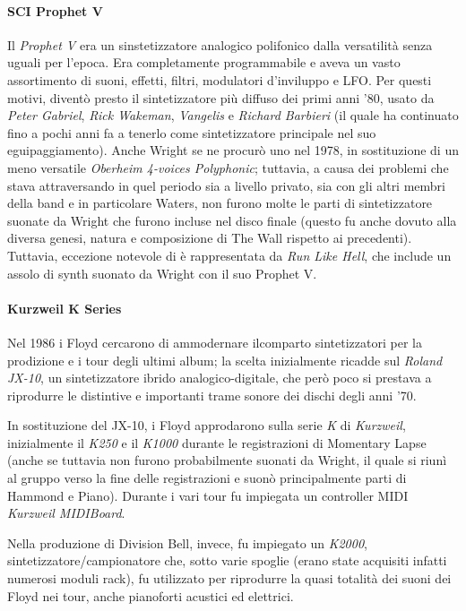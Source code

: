 \documentclass[class=book, crop=false, oneside, 12pt]{standalone}
\begin{document}
    \paragraph{SCI Prophet V}
    Il \emph{Prophet V} era un sinstetizzatore analogico polifonico dalla versatilità senza uguali per l'epoca. Era completamente programmabile e aveva un vasto assortimento di suoni, effetti, filtri, modulatori d'inviluppo e LFO. Per questi motivi, diventò presto il sintetizzatore più diffuso dei primi anni '80, usato da \emph{Peter Gabriel}, \emph{Rick Wakeman}, \emph{Vangelis} e \emph{Richard Barbieri} (il quale ha continuato fino a pochi anni fa a tenerlo come sintetizzatore principale nel suo eguipaggiamento). Anche Wright se ne procurò uno nel 1978, in sostituzione di un meno versatile \emph{Oberheim 4-voices Polyphonic}; tuttavia, a causa dei problemi che stava attraversando in quel periodo sia a livello privato, sia con gli altri membri della band e in particolare Waters, non furono molte le parti di sintetizzatore suonate da Wright che furono incluse nel disco finale (questo fu anche dovuto alla diversa genesi, natura e composizione di The Wall rispetto ai precedenti). Tuttavia, eccezione notevole di è rappresentata da \emph{Run Like Hell}, che include un assolo di synth suonato da Wright con il suo Prophet V.

    \paragraph{Kurzweil K Series}
    Nel 1986 i Floyd cercarono di ammodernare ilcomparto sintetizzatori per la prodizione e i  tour degli ultimi album; la scelta inizialmente ricadde sul \emph{Roland JX-10}, un sintetizzatore ibrido analogico-digitale, che però poco si prestava a riprodurre le distintive e importanti trame sonore dei dischi degli anni '70.

    In sostituzione del JX-10, i Floyd approdarono sulla serie \emph{K} di \emph{Kurzweil}, inizialmente il \emph{K250} e il \emph{K1000} durante le registrazioni di Momentary Lapse (anche se tuttavia non furono probabilmente suonati da Wright, il quale si riunì al gruppo verso la fine delle registrazioni e suonò principalmente parti di Hammond e Piano). Durante i vari tour fu impiegata un controller MIDI \emph{Kurzweil MIDIBoard}.

    Nella produzione di Division Bell, invece, fu impiegato un \emph{K2000}, sintetizzatore/campionatore che, sotto varie spoglie (erano state acquisiti infatti numerosi moduli rack), fu utilizzato per riprodurre la quasi totalità dei suoni dei Floyd nei tour, anche pianoforti acustici ed elettrici.
\end{document}
